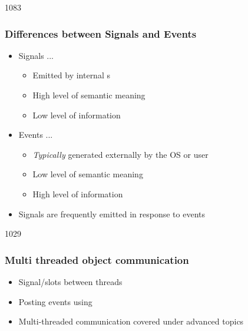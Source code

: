 \begin{slide}[fragile]{1083}
\frametitle{Differences between Signals and Events}

\begin{itemize}
\item Signals ...
  \begin{itemize}
  \item Emitted by internal s
  \item High level of semantic meaning
  \item Low level of information
  \end{itemize}
\item Events ...
  \begin{itemize}
  \item \textit{Typically} generated externally by the OS or user
  \item Low level of semantic meaning
  \item High level of information
  \end{itemize}
\item Signals are frequently emitted in response to events
\end{itemize}
\end{slide}

\begin{slide}{1029}\frametitle{Multi threaded object communication}
  \begin{itemize}
  \item Signal/slots between threads
  \item Posting events using\\
  \item Multi-threaded communication covered under advanced topics
  \end{itemize}
\end{slide}

